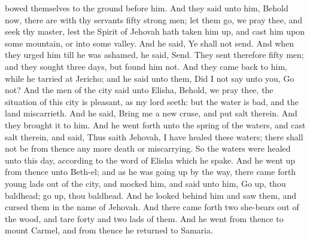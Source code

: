 bowed themselves to the ground before him. And they said unto him, Behold now, there are with thy servants fifty strong men; let them go, we pray thee, and seek thy master, lest the Spirit of Jehovah hath taken him up, and cast him upon some mountain, or into some valley. And he said, Ye shall not send. And when they urged him till he was ashamed, he said, Send. They sent therefore fifty men; and they sought three days, but found him not. And they came back to him, while he tarried at Jericho; and he said unto them, Did I not say unto you, Go not?  And the men of the city said unto Elisha, Behold, we pray thee, the situation of this city is pleasant, as my lord seeth: but the water is bad, and the land miscarrieth. And he said, Bring me a new cruse, and put salt therein. And they brought it to him. And he went forth unto the spring of the waters, and cast salt therein, and said, Thus saith Jehovah, I have healed these waters; there shall not be from thence any more death or miscarrying. So the waters were healed unto this day, according to the word of Elisha which he spake.  And he went up from thence unto Beth-el; and as he was going up by the way, there came forth young lads out of the city, and mocked him, and said unto him, Go up, thou baldhead; go up, thou baldhead. And he looked behind him and saw them, and cursed them in the name of Jehovah. And there came forth two she-bears out of the wood, and tare forty and two lads of them. And he went from thence to mount Carmel, and from thence he returned to Samaria. 

